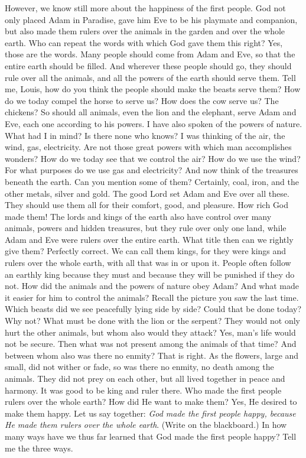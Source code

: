 However, we know still more about the happiness of the first people. God not only placed Adam in Paradise, gave him Eve to be his playmate and companion, but also made them rulers over the animals in the garden and over the whole earth. Who can repeat the words with which God gave them this right? Yes, those are the words. Many people should come from Adam and Eve, so that the entire earth should be filled. And wherever these people should go, they should rule over all the animals, and all the powers of the earth should serve them. Tell me, Louis, how do you think the people should make the beasts serve them? How do we today compel the horse to serve us? How does the cow serve us? The chickens? So should all animals, even the lion and the elephant, serve Adam and Eve, each one according to his powers. I have also spoken of the powers of nature. What had I in mind? Is there none who knows? I was thinking of the air, the wind, gas, electricity. Are not those great powers with which man accomplishes wonders? How do we today see that we control the air? How do we use the wind? For what purposes do we use gas and electricity? And now think of the treasures beneath the earth. Can you mention some of them? Certainly, coal, iron, and the other metals, silver and gold. The good Lord set Adam and Eve
over all these. They should use them all for their comfort, good, and pleasure. How rich God made them! The lords and kings of the earth also have control over many animals, powers and hidden treasures, but they rule over only one land, while Adam and Eve were rulers over the entire earth. What title then can we rightly give them? Perfectly correct. We can call them kings, for they were kings and rulers over the whole earth, with all that was in or upon it. People often follow an earthly king because they must and because they will be punished if they do not. How did the animals and the powers of nature obey Adam? And what made it easier for him to control the animals? Recall the picture you saw the last time. Which beasts did we see peacefully lying side by side? Could that be done today? Why not? What must be done with the lion or the serpent? They would not only hurt the other animals, but whom also would they attack? Yes, man's life would not be secure. Then what was not present among the animals of that time? And between whom also was there no enmity? That is right. As the flowers, large and small, did not wither or fade, so was there no enmity, no death among the animals. They did not prey on each other, but all lived together in peace and harmony. It was good to be king and ruler there. Who made the first people rulers over the whole earth? How did He want to make them? Yes, He desired to make them happy. Let us say together: \emph{God made the first people happy, because He made them rulers over the whole earth}. (Write on the blackboard.) In how many ways have we thus far learned that God made the first people happy? Tell me the three ways.

